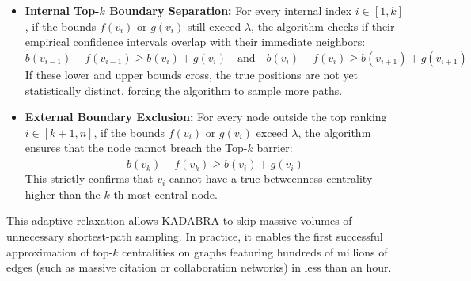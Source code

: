 \begin{itemize}
    \item \textbf{Internal Top-$k$ Boundary Separation:} For every internal index $i \in [1, k]$, if the bounds $f(v_i)$ or $g(v_i)$ still exceed $\lambda$, the algorithm checks if their empirical confidence intervals overlap with their immediate neighbors:
    \begin{equation}
    \tilde{b}(v_{i-1}) - f(v_{i-1}) \ge \tilde{b}(v_i) + g(v_i) \quad \text{and} \quad \tilde{b}(v_i) - f(v_i) \ge \tilde{b}(v_{i+1}) + g(v_{i+1})
    \end{equation}
    If these lower and upper bounds cross, the true positions are not yet statistically distinct, forcing the algorithm to sample more paths.
    
    \item \textbf{External Boundary Exclusion:} For every node outside the top ranking $i \in [k+1, n]$, if the bounds $f(v_i)$ or $g(v_i)$ exceed $\lambda$, the algorithm ensures that the node cannot breach the Top-$k$ barrier:
    \begin{equation}
    \tilde{b}(v_k) - f(v_k) \ge \tilde{b}(v_i) + g(v_i)
    \end{equation}
    This strictly confirms that $v_i$ cannot have a true betweenness centrality higher than the $k$-th most central node.
\end{itemize}

This adaptive relaxation allows KADABRA to skip massive volumes of unnecessary shortest-path sampling. In practice, it enables the first successful approximation of top-$k$ centralities on graphs featuring hundreds of millions of edges (such as massive citation or collaboration networks) in less than an hour.